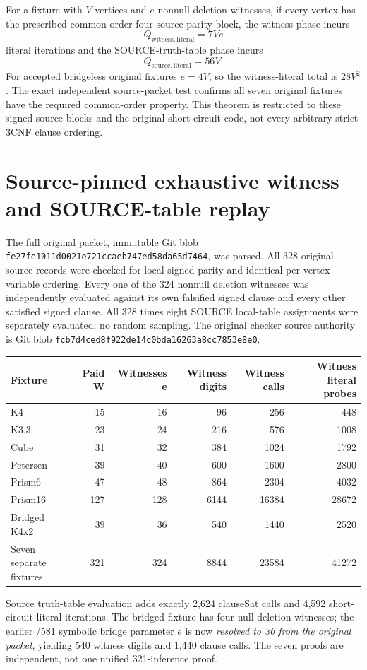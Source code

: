 \documentclass[11pt]{article}
\begin{document}
For a fixture with $V$ vertices and $e$ nonnull deletion witnesses, if every vertex has the prescribed common-order four-source parity block, the witness phase incurs
\[
\boxed{Q_{\mathrm{witness,literal}}=7Ve}
\]
literal iterations and the SOURCE-truth-table phase incurs
\[
\boxed{Q_{\mathrm{source,literal}}=56V}.
\]
For accepted bridgeless original fixtures $e=4V$, so the witness-literal total is $28V^2$. The exact independent source-packet test confirms all seven original fixtures have the required common-order property. This theorem is restricted to these signed source blocks and the original short-circuit code, not every arbitrary strict 3CNF clause ordering.

\section*{Source-pinned exhaustive witness and SOURCE-table replay}
The full original packet, immutable Git blob \texttt{fe27fe1011d0021e721ccaeb747ed58da65d7464}, was parsed. All 328 original source records were checked for local signed parity and identical per-vertex variable ordering. Every one of the 324 nonnull deletion witnesses was independently evaluated against its own falsified signed clause and every other satisfied signed clause. All 328 times eight SOURCE local-table assignments were separately evaluated; no random sampling. The original checker source authority is Git blob \texttt{fcb7d4ced8f922de14c0bda16263a8cc7853e8e0}.

\begin{center}\begin{tabular}{lrrrrr}\toprule
Fixture & Paid W & Witnesses e & Witness digits & Witness calls & Witness literal probes\\\midrule
K4 &15&16&96&256&448\\
K3,3 &23&24&216&576&1008\\
Cube &31&32&384&1024&1792\\
Petersen &39&40&600&1600&2800\\
Prism6 &47&48&864&2304&4032\\
Prism16 &127&128&6144&16384&28672\\
Bridged K4x2 &39&36&540&1440&2520\\\midrule
Seven separate fixtures &321&324&8844&23584&41272\\\bottomrule\end{tabular}\end{center}
Source truth-table evaluation adds exactly 2,624 clauseSat calls and 4,592 short-circuit literal iterations. The bridged fixture has four null deletion witnesses; the earlier /581 symbolic bridge parameter $e$ is now \emph{resolved to 36 from the original packet}, yielding 540 witness digits and 1,440 clause calls. The seven proofs are independent, not one unified 321-inference proof.
\end{document}
